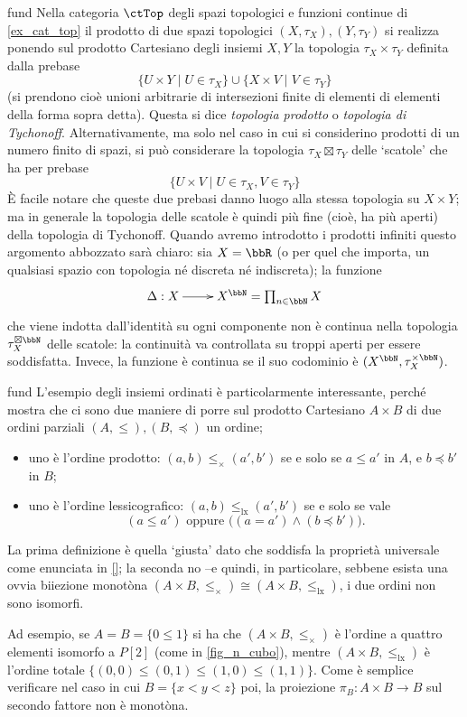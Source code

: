 \begin{hExample}{fund}\label{ex_prodotti_in_top}
 Nella categoria \(\ctTop\) degli spazi topologici e funzioni continue di \ref{ex_cat_top} il prodotto di due spazi topologici \((X,\tau_X),(Y,\tau_Y)\) si realizza ponendo sul prodotto Cartesiano degli insiemi \(X,Y\) la topologia \(\tau_X\times \tau_Y\) definita dalla prebase
 \[\{U\times Y\mid U\in \tau_X\}\cup\{X\times V\mid V\in \tau_Y\}\]
 (si prendono cioè unioni arbitrarie di intersezioni finite di elementi di elementi della forma sopra detta). Questa si dice \emph{topologia prodotto} o \emph{topologia di Tychonoff}. Alternativamente, ma solo nel caso in cui si considerino prodotti di un numero finito di spazi, si può considerare la topologia \(\tau_X\boxtimes\tau_Y\) delle `scatole' che ha per prebase
 \[\{U\times V\mid U\in \tau_X,V\in \tau_Y\}\]
 È facile notare che queste due prebasi danno luogo alla stessa topologia su \(X\times Y\); ma in generale la topologia delle scatole è quindi più fine (cioè, ha più aperti) della topologia di Tychonoff. Quando avremo introdotto i prodotti infiniti questo argomento abbozzato sarà chiaro: sia \(X=\bbR\) (o per quel che importa, un qualsiasi spazio con topologia né discreta né indiscreta); la funzione
 \[\xymatrix{\Delta : X \ar[r] & X^\bbN=\prod_{n\in\bbN} X}\]
 che viene indotta dall'identità su ogni componente non è continua nella topologia \(\tau_X^{\boxtimes\bbN}\) delle scatole: la continuità va controllata su troppi aperti per essere soddisfatta. Invece, la funzione è continua se il suo codominio è \((X^\bbN,\tau_X^{\times\bbN})\).
\end{hExample}
\begin{hExample}{fund}\label{ex_prodotti_in_pos}
 L'esempio degli insiemi ordinati è particolarmente interessante, perché mostra che ci sono due maniere di porre sul prodotto Cartesiano \(A\times B\) di due ordini parziali \((A,\le), (B,\preceq)\) un ordine;
 \begin{itemize}
  \item uno è l'ordine prodotto: \((a,b)\le_\times (a',b')\) se e solo se \(a\le a'\) in \(A\), e \(b\preceq b'\) in \(B\);
  \item uno è l'ordine lessicografico: \((a,b)\le_\text{lx} (a',b')\) se e solo se vale
        \[(a\le a') \text{ oppure } \bigl( (a=a') \land (b\preceq b') \bigr).\]
 \end{itemize}
 La prima definizione è quella `giusta' dato che soddisfa la proprietà universale come enunciata in \ref{}; la seconda no --e quindi, in particolare, sebbene esista una ovvia biiezione monotòna \((A\times B,\le_\times) \cong (A\times B,\le_\text{lx})\), i due ordini non sono isomorfi.

 Ad esempio, se \(A=B=\{0\le 1\}\) si ha che \((A\times B,\le_\times)\) è l'ordine a quattro elementi isomorfo a \(P[2]\) (come in \ref{fig_n_cubo}), mentre \((A\times B,\le_\text{lx})\) è l'ordine totale \(\{(0,0) \le (0,1) \le (1,0) \le (1,1)\}\). Come è semplice verificare nel caso in cui \(B=\{x<y<z\}\) poi, la proiezione \(\pi_B \colon A\times B \to B\) sul secondo fattore non è monotòna.
\end{hExample}
